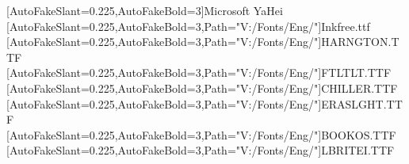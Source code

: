 \usepackage{xparse}

\usepackage{xltxtra}

\usepackage{etoolbox}

\usepackage{setspace}

\newtoggle{usefont}
\toggletrue{usefont}

\usepackage{fontspec}
\iftoggle{usefont}{
    \setmainfont[Path="V:/Fonts/Eng/",AutoFakeBold=3,AutoFakeSlant=0.25]{BASKVILL.TTF}
    \setsansfont[Path="V:/Fonts/Eng/",AutoFakeBold=3,AutoFakeSlant=0.25]{POORICH.TTF}
    \setmonofont[Path="V:/Fonts/Eng/",AutoFakeBold=3,AutoFakeSlant=0.25]{cour.ttf}
}{}

\usepackage{xeCJK}
\iftoggle{usefont}{
}{}

\newfontfamily{\yh}[AutoFakeSlant=0.225,AutoFakeBold=3]{Microsoft YaHei}
\newfontfamily{\fontik}[AutoFakeSlant=0.225,AutoFakeBold=3,Path="V:/Fonts/Eng/"]{Inkfree.ttf}
\newfontfamily{\fontss}[AutoFakeSlant=0.225,AutoFakeBold=3,Path="V:/Fonts/Eng/"]{HARNGTON.TTF}
\newfontfamily{\fontfl}[AutoFakeSlant=0.225,AutoFakeBold=3,Path="V:/Fonts/Eng/"]{FTLTLT.TTF}
\newfontfamily{\fontch}[AutoFakeSlant=0.225,AutoFakeBold=3,Path="V:/Fonts/Eng/"]{CHILLER.TTF}
\newfontfamily{\fontrm}[AutoFakeSlant=0.225,AutoFakeBold=3,Path="V:/Fonts/Eng/"]{ERASLGHT.TTF}
\newfontfamily{\fontbk}[AutoFakeSlant=0.225,AutoFakeBold=3,Path="V:/Fonts/Eng/"]{BOOKOS.TTF}
\newfontfamily{\fontlr}[AutoFakeSlant=0.225,AutoFakeBold=3,Path="V:/Fonts/Eng/"]{LBRITEI.TTF}

\usepackage{amsmath,amssymb,amsthm,amsfonts,mathrsfs}
\usepackage[scr=boondoxupr]{mathalfa}
\usepackage{mathtools}
\usepackage{physics}
\usepackage{esint}
\usepackage{bm}

\usepackage{xcolor}

\usepackage{colortbl}
\usepackage{makecell}
\usepackage{multirow}
\usepackage{longtable}
\usepackage{booktabs}





